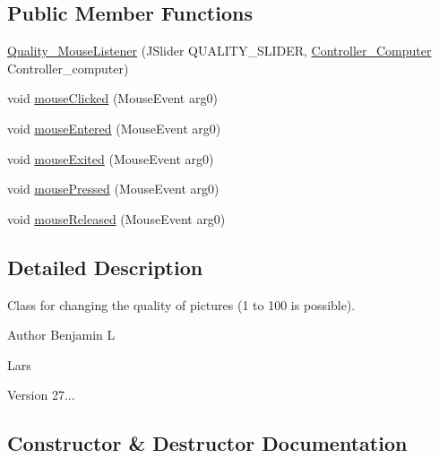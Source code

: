 \subsection*{Public Member Functions}
\begin{DoxyCompactItemize}
\item 
\hyperlink{class_view_1_1_quality___mouse_listener_ae98014732983b888ef77b1560654bdba}{Quality\+\_\+\+Mouse\+Listener} (J\+Slider Q\+U\+A\+L\+I\+T\+Y\+\_\+\+S\+L\+I\+D\+E\+R, \hyperlink{class_controller_1_1_controller___computer}{Controller\+\_\+\+Computer} Controller\+\_\+computer)
\item 
void \hyperlink{class_view_1_1_quality___mouse_listener_aa3241d2c9ed28fa2491970433f10a842}{mouse\+Clicked} (Mouse\+Event arg0)
\item 
void \hyperlink{class_view_1_1_quality___mouse_listener_ac05246ee7a8a65a9920603170da5a92b}{mouse\+Entered} (Mouse\+Event arg0)
\item 
void \hyperlink{class_view_1_1_quality___mouse_listener_a4f3552eeaa33de97702c107b8cbbbe9d}{mouse\+Exited} (Mouse\+Event arg0)
\item 
void \hyperlink{class_view_1_1_quality___mouse_listener_a1eede069f35647dbf6e5a1c366c329f8}{mouse\+Pressed} (Mouse\+Event arg0)
\item 
void \hyperlink{class_view_1_1_quality___mouse_listener_a398f98ad5454bb4f713798c3ba4eb177}{mouse\+Released} (Mouse\+Event arg0)
\end{DoxyCompactItemize}


\subsection{Detailed Description}
Class for changing the quality of pictures (1 to 100 is possible).

\begin{DoxyAuthor}{Author}
Benjamin L 

Lars 
\end{DoxyAuthor}
\begin{DoxyVersion}{Version}
27... 
\end{DoxyVersion}


\subsection{Constructor \& Destructor Documentation}
\hypertarget{class_view_1_1_quality___mouse_listener_ae98014732983b888ef77b1560654bdba}{}
